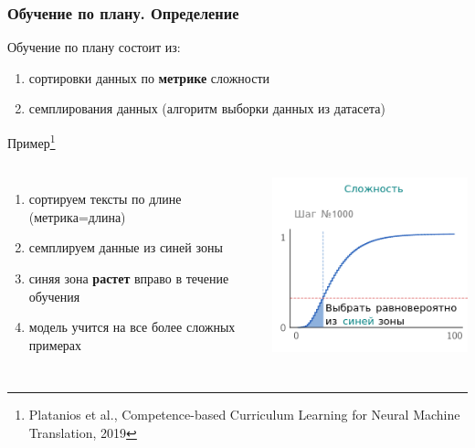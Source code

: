 \documentclass{beamer}
\begin{document}
\begin{frame}
	\frametitle{Обучение по плану. Определение}
	
	Обучение по плану состоит из:
		\begin{enumerate}
			\item сортировки данных по {\bf метрике} сложности
			\item семплирования данных (алгоритм выборки данных из датасета)
		\end{enumerate}
	\vspace*{20pt}
	Пример\footnote{Platanios et al., Competence-based Curriculum Learning for Neural Machine Translation, 2019}
	\begin{columns}
		\begin{enumerate}
			\item сортируем тексты по длине (метрика=длина)
			\item семплируем данные из синей зоны
			\item синяя зона {\bf растет} вправо в течение обучения
			\item модель учится на все более сложных примерах
		\end{enumerate}
		\includegraphics[scale=0.8]{acl19_algo.png}
	\end{columns}
\end{frame}
\end{document}
